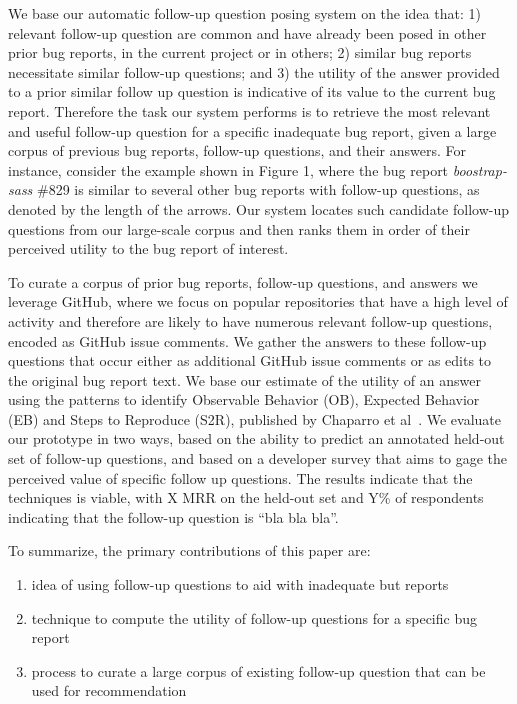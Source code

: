 %
We base our automatic follow-up question posing system on the idea that: 1) relevant follow-up question are common and have already been posed in other prior bug reports, in the current project or in others; 2) similar bug reports necessitate similar follow-up questions; and 3) the utility of the answer provided to a prior similar follow up question is indicative of its value to the current bug report.
%
Therefore the task our system performs is to retrieve the most relevant and useful follow-up question for a specific inadequate bug report, given a large corpus of previous bug reports, follow-up questions, and their answers.
%
For instance, consider the example shown in Figure 1, where the bug report {\em boostrap-sass} \#829 is similar to several other bug reports with follow-up questions, as denoted by the length of the arrows.
%
Our system locates such candidate follow-up questions from our large-scale corpus and then ranks them in order of their perceived utility to the bug report of interest.

To curate a corpus of prior bug reports, follow-up questions, and answers we leverage GitHub, where we focus on popular repositories that have a high level of activity and therefore are likely to have numerous relevant follow-up questions, encoded as GitHub issue comments. We gather the answers to these follow-up questions that occur either as additional GitHub issue comments or as edits to the original bug report text. We base our estimate of the utility of an answer using the patterns to identify Observable Behavior (OB), Expected Behavior (EB) and Steps to Reproduce (S2R), published by Chaparro et al~\cite{chaparro17detecting}. We evaluate our prototype in two ways, based on the ability to predict an annotated held-out set of follow-up questions, and based on a developer survey that aims to gage the perceived value of specific follow up questions. The results indicate that the techniques is viable, with X MRR on the held-out set and Y\% of respondents indicating that the follow-up question is “bla bla bla”.

To summarize, the primary contributions of this paper are:
\begin{enumerate}
\item idea of using follow-up questions to aid with inadequate but reports
\item technique to compute the utility of follow-up questions for a specific bug report
\item process to curate a large corpus of existing follow-up question that can be used for recommendation
\end{enumerate}

